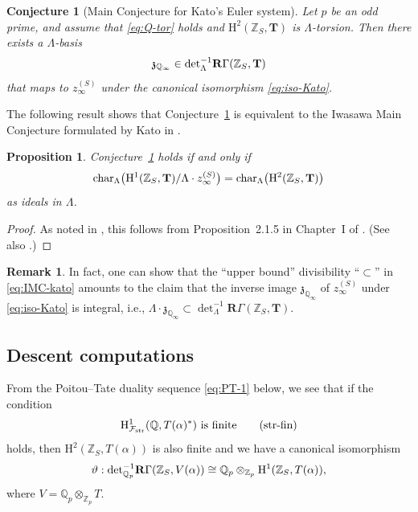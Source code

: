 \documentclass[10pt,reqno]{amsart}
\numberwithin{equation}{section}
\theoremstyle{plain}
\theoremstyle{definition}
\newtheorem{rmk}[thm]{Remark}
\theoremstyle{definition}
\theoremstyle{plain}
\newtheorem{prop}[thm]{Proposition}
\theoremstyle{plain}
\theoremstyle{plain}
\theoremstyle{plain}
\newtheorem{conj}[thm]{Conjecture}
\theoremstyle{plain}
\theoremstyle{plain}
\newcommand{\Tc}{\mathbf{T}}
\newcommand{\Z}{\mathbb{Z}}
\newcommand{\Q}{\mathbb{Q}}
\newcommand{\Fcal}{\mathcal{F}}
\newcommand{\rH}{\mathrm{H}}
\begin{document}
\begin{conj}[Main Conjecture for Kato's Euler system]\label{conj:IMC-det}
Let $p$ be an odd prime, and assume that \eqref{eq:Q-tor} holds and $\rH^2(\Z_S,\Tc)$ is $\Lambda$-torsion. Then there exists a $\Lambda$-basis
\[
\mathfrak{z}_{\Q_\infty}\in{\rm det}_\Lambda^{-1}\mathbf{R}\Gamma(\Z_S,\Tc)
\]
that maps to $z_{\infty}^{(S)}$ 
under the canonical isomorphism \eqref{eq:iso-Kato}.
\end{conj}

The following result shows that Conjecture~\ref{conj:IMC-det} is equivalent to the Iwasawa Main Conjecture formulated by Kato in \cite[Conj.~12.10]{kato-euler-systems}.

\begin{prop}\label{prop:equiv-cyc}
Conjecture~\ref{conj:IMC-det} holds if and only if
\begin{equation}\label{eq:IMC-kato}
{\rm char}_\Lambda\bigl(\rH^1(\Z_S,\Tc)/\Lambda\cdot z_{\infty}^{(S)}\bigr)={\rm char}_\Lambda\bigl(\rH^2(\Z_S,\Tc)\bigr)
\end{equation}
as ideals in $\Lambda$.
\end{prop}

\begin{proof}
As noted in \cite[Rem. 7.2]{bks-katoI}, this follows from Proposition~2.1.5 in Chapter~I of \cite{kato-lecture}. (See also \cite[Prop.~3.10]{kataoka-sano}.) %
\end{proof}

\begin{rmk}\label{rem:div-int}
In fact, one can show that the ``upper bound'' divisibility ``$\subset$'' in \eqref{eq:IMC-kato} amounts to the claim that the inverse image $\mathfrak{z}_{\Q_\infty}$ of $z_{\infty}^{(S)}$ under \eqref{eq:iso-Kato} is integral, i.e.,  $\Lambda\cdot\mathfrak{z}_{\Q_\infty}\subset{\det}_\Lambda^{-1}\mathbf{R}\Gamma(\Z_S,\Tc)$.
\end{rmk}

\subsection{Descent computations}\label{subsec:descent-kato}

From the Poitou--Tate duality sequence \eqref{eq:PT-1} below, we see that if the condition 
\begin{equation}\label{eq:rank0}
\textrm{$\rH^1_{\Fcal_{\rm str}}(\Q,T(\alpha)^*)$ is finite}\tag{str-fin}
\end{equation}
holds, %
then $\rH^2(\Z_S,T(\alpha))$ is also finite 
and we have a canonical isomorphism
\[
\vartheta:{\rm det}_{\Q_p}^{-1}\mathbf{R}\Gamma(\Z_S,V(\alpha))\cong\Q_p\otimes_{\Z_p}\rH^1(\Z_S,T(\alpha)),
\]
where $V=\Q_p\otimes_{\Z_p}T$.
\end{document}
